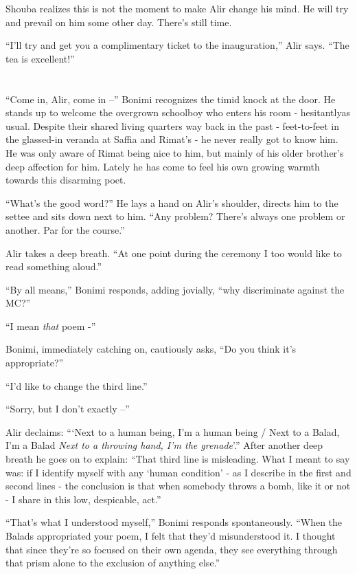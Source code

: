 \documentclass[twoside,11pt]{book}
\begin{document}
Shouba realizes this is not the moment to make Alir change his mind. He will try and prevail on him some other day.
There's still time.

``I'll try and get you a complimentary ticket to the inauguration,'' Alir says.
``The tea is excellent!''



\chapter{}

``Come in, Alir, come in --'' Bonimi recognizes the timid knock at the door. He stands up to
welcome the overgrown schoolboy who enters his room - hesitantlyas usual. Despite their shared living quarters way back
in the past - feet-to-feet in the glassed-in veranda at Saffia and Rimat's - he never really got to
know him. He was only aware of Rimat being nice to him, but mainly of his older brother's deep affection for him.
Lately he has come to feel his own growing warmth towards this disarming poet.

``What's the good word?'' He lays a hand on Alir's shoulder, directs him to the settee and
sits down next to him. ``Any problem? There's always one problem or another. Par for the
course.''

Alir takes a deep breath. ``At one point during the ceremony I too would like to read something
aloud.''

``By all means,'' Bonimi responds, adding jovially, ``why discriminate against
the MC?''

``I mean \textit{that} poem -''

Bonimi, immediately catching on, cautiously asks, ``Do you think it's appropriate?''

``I'd like to change the third line.''

``Sorry, but I don't exactly --''

Alir declaims: ``{`Next} to a human being, I'm a human being / Next to a Balad, I'm a Balad \textit{Next to
a throwing hand, I'm the grenade}'.'' After another deep breath he goes on to explain:
``That third line is misleading. What I meant to say was:  if I identify myself with any `human condition'
- as I describe in the first and second lines -  the conclusion is that when somebody throws a  bomb,  like it or not -
I share in this low, despicable, act.''

``That's what I understood myself,'' Bonimi responds spontaneously. ``When the
Balads appropriated your poem, I felt that they'd misunderstood it. I thought that since they're so focused on their
own agenda, they see everything through that prism alone to the exclusion of anything else.''
\end{document}
